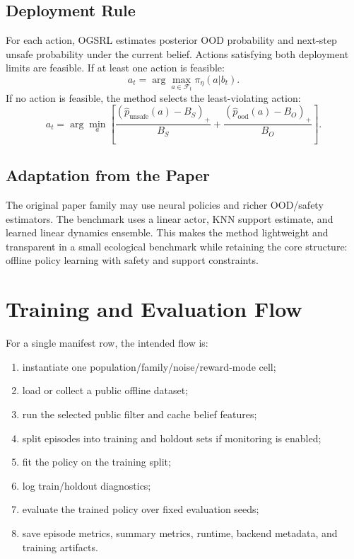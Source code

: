 \documentclass[11pt]{article}
\newcommand{\1}{\mathbf{1}}
\begin{document}
\subsection{Deployment Rule}

For each action, OGSRL estimates posterior OOD probability and next-step unsafe
probability under the current belief.  Actions satisfying both deployment limits
are feasible.  If at least one action is feasible:
\[
  a_t=\arg\max_{a\in\mathcal{F}_t}\pi_\eta(a|b_t).
\]
If no action is feasible, the method selects the least-violating action:
\[
  a_t=\arg\min_a
  \left[
    \frac{(\hat{p}_{\mathrm{unsafe}}(a)-B_S)_+}{B_S}
    +
    \frac{(\hat{p}_{\mathrm{ood}}(a)-B_O)_+}{B_O}
  \right].
\]

\subsection{Adaptation from the Paper}

The original paper family may use neural policies and richer OOD/safety
estimators.  The benchmark uses a linear actor, KNN support estimate, and learned
linear dynamics ensemble.  This makes the method lightweight and transparent in a
small ecological benchmark while retaining the core structure: offline policy
learning with safety and support constraints.

\section{Training and Evaluation Flow}

For a single manifest row, the intended flow is:
\begin{enumerate}[leftmargin=*]
  \item instantiate one population/family/noise/reward-mode cell;
  \item load or collect a public offline dataset;
  \item run the selected public filter and cache belief features;
  \item split episodes into training and holdout sets if monitoring is enabled;
  \item fit the policy on the training split;
  \item log train/holdout diagnostics;
  \item evaluate the trained policy over fixed evaluation seeds;
  \item save episode metrics, summary metrics, runtime, backend metadata, and
  training artifacts.
\end{enumerate}
\end{document}
